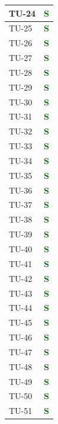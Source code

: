 \begin{longtable}{|C{2.5cm}|C{2.5cm}|}
	{TU-24} & \textcolor{darkgreen}{\textbf{S}}\\
	\hline
	{TU-25} & \textcolor{darkgreen}{\textbf{S}}\\
	\hline
	{TU-26} & \textcolor{darkgreen}{\textbf{S}}\\
	\hline
	{TU-27} & \textcolor{darkgreen}{\textbf{S}}\\
	\hline
	{TU-28} & \textcolor{darkgreen}{\textbf{S}}\\
	\hline
	{TU-29} & \textcolor{darkgreen}{\textbf{S}}\\
	\hline
	{TU-30} & \textcolor{darkgreen}{\textbf{S}}\\
	\hline
	{TU-31} & \textcolor{darkgreen}{\textbf{S}}\\
	\hline
	{TU-32} & \textcolor{darkgreen}{\textbf{S}}\\
	\hline
	{TU-33} & \textcolor{darkgreen}{\textbf{S}}\\
	\hline
	{TU-34} & \textcolor{darkgreen}{\textbf{S}}\\
	\hline
	{TU-35} & \textcolor{darkgreen}{\textbf{S}}\\
	\hline
	{TU-36} & \textcolor{darkgreen}{\textbf{S}}\\
	\hline
	{TU-37} & \textcolor{darkgreen}{\textbf{S}}\\
	\hline
	{TU-38} & \textcolor{darkgreen}{\textbf{S}}\\
	\hline
	{TU-39} & \textcolor{darkgreen}{\textbf{S}}\\
	\hline
	{TU-40} & \textcolor{darkgreen}{\textbf{S}}\\
	\hline
	{TU-41} & \textcolor{darkgreen}{\textbf{S}}\\
	\hline
	{TU-42} & \textcolor{darkgreen}{\textbf{S}}\\
	\hline
	{TU-43} & \textcolor{darkgreen}{\textbf{S}}\\
	\hline
	{TU-44} & \textcolor{darkgreen}{\textbf{S}}\\
	\hline
	{TU-45} & \textcolor{darkgreen}{\textbf{S}}\\
	\hline
	{TU-46} & \textcolor{darkgreen}{\textbf{S}}\\
	\hline
	{TU-47} & \textcolor{darkgreen}{\textbf{S}}\\
	\hline
	{TU-48} & \textcolor{darkgreen}{\textbf{S}}\\
	\hline
	{TU-49} & \textcolor{darkgreen}{\textbf{S}}\\
	\hline
	{TU-50} & \textcolor{darkgreen}{\textbf{S}}\\
	\hline
	{TU-51} & \textcolor{darkgreen}{\textbf{S}}\\

\end{longtable}
